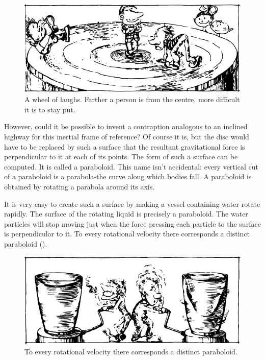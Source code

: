 \begin{figure}[!ht]
\centering
\includegraphics[width=\textwidth]{figures/fig-02-11.pdf}
\caption{A wheel of laughs. Farther a person is from the centre, more difficult it is to stay put.}
\label{fig-2.11}
\end{figure}

However, could it be possible to invent a contraption
analogous to an inclined highway for this inertial frame
of reference? Of course it is, but the disc would have to
be replaced by such a surface that the resultant gravitational force is perpendicular to it at each of its points.
The form of such a surface can be computed. It is called
a paraboloid. This name isn't accidental: every vertical
cut of a paraboloid is a parabola-the curve along which
bodies fall. A paraboloid is obtained by rotating a parabola around its axis.

It is very easy to create such a surface by making a vessel containing water rotate rapidly. The surface of the
rotating liquid is precisely a paraboloid. The water
particles will stop moving just when the force pressing
each particle to the surface is perpendicular to it. To
every rotational velocity there corresponds a distinct
paraboloid ().

\begin{figure}[!ht]
\centering
\includegraphics[width=\textwidth]{figures/fig-02-12.pdf}
\caption{To every rotational velocity there corresponds a distinct paraboloid.}
\label{fig-2.12}
\end{figure}


